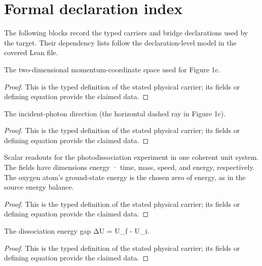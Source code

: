 \section*{Formal declaration index}
The following blocks record the typed carriers and bridge declarations used by the target.  Their dependency lists follow the declaration-level model in the covered Lean file.

\begin{definition}
  \label{def:physics:IPhO_2026_1_C_1:aux001}
  The two-dimensional momentum-coordinate space used for Figure 1c.
\end{definition}
\begin{proof}
  This is the typed definition of the stated physical carrier; its fields or defining equation provide the claimed data.
\end{proof}

\begin{definition}
  \label{def:physics:IPhO_2026_1_C_1:aux002}
  The incident-photon direction (the horizontal dashed ray in Figure 1c).
\end{definition}
\begin{proof}
  This is the typed definition of the stated physical carrier; its fields or defining equation provide the claimed data.
\end{proof}

\begin{definition}
  \label{def:physics:IPhO_2026_1_C_1:aux003}
  Scalar readouts for the photodissociation experiment in one coherent unit system. The fields have dimensions energy · time, mass, speed, and energy, respectively. The oxygen atom's ground-state energy is the chosen zero of energy, as in the source energy balance.
\end{definition}
\begin{proof}
  This is the typed definition of the stated physical carrier; its fields or defining equation provide the claimed data.
\end{proof}

\begin{definition}
  \label{def:physics:IPhO_2026_1_C_1:aux004}
  The dissociation energy gap ΔU = U\_f - U\_i.
\end{definition}
\begin{proof}
  This is the typed definition of the stated physical carrier; its fields or defining equation provide the claimed data.
\end{proof}

